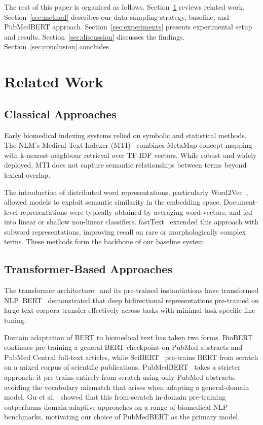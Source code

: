 \documentclass[sigconf]{acmart}
\begin{document}
The rest of this paper is organised as follows. Section~\ref{sec:related} reviews related work.
Section~\ref{sec:method} describes our data sampling strategy, baseline, and PubMedBERT approach.
Section~\ref{sec:experiments} presents experimental setup and results.
Section~\ref{sec:discussion} discusses the findings.
Section~\ref{sec:conclusion} concludes.

\section{Related Work}
\label{sec:related}

\subsection{Classical Approaches}

Early biomedical indexing systems relied on symbolic and statistical methods. The NLM's Medical
Text Indexer (MTI)~\cite{mti} combines MetaMap concept mapping with k-nearest-neighbour retrieval
over TF-IDF vectors. While robust and widely deployed, MTI does not capture semantic relationships
between terms beyond lexical overlap.

The introduction of distributed word representations, particularly Word2Vec~\cite{mikolov2013},
allowed models to exploit semantic similarity in the embedding space. Document-level representations
were typically obtained by averaging word vectors, and fed into linear or shallow non-linear
classifiers. fastText~\cite{joulin2017} extended this approach with subword representations,
improving recall on rare or morphologically complex terms. These methods form the backbone of our
baseline system.

\subsection{Transformer-Based Approaches}

The transformer architecture~\cite{vaswani2017} and its pre-trained instantiations have transformed
NLP. BERT~\cite{devlin2019bert} demonstrated that deep bidirectional representations pre-trained
on large text corpora transfer effectively across tasks with minimal task-specific fine-tuning.

Domain adaptation of BERT to biomedical text has taken two forms. BioBERT~\cite{lee2020biobert}
continues pre-training a general BERT checkpoint on PubMed abstracts and PubMed Central full-text
articles, while SciBERT~\cite{beltagy2019scibert} pre-trains BERT from scratch on a mixed corpus
of scientific publications. PubMedBERT~\cite{pubmedbert} takes a stricter approach: it pre-trains
entirely from scratch using only PubMed abstracts, avoiding the vocabulary mismatch that arises
when adapting a general-domain model. Gu et al.~\cite{pubmedbert} showed that this from-scratch
in-domain pre-training outperforms domain-adaptive approaches on a range of biomedical NLP
benchmarks, motivating our choice of PubMedBERT as the primary model.
\end{document}
